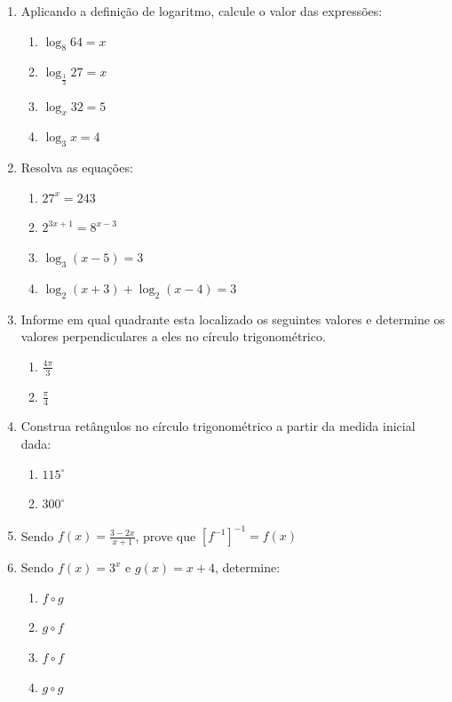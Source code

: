 \documentclass[oneside,a4paper,12pt]{article}
\begin{document}
\begin{enumerate}
	\item Aplicando a definição de logaritmo, calcule o valor das expressões:
	\begin{multicols}{4}
	\begin{enumerate}
		\item $ \log_{8}64=x$
		\item $ \log_{\frac{1}{3}}27=x$
		\item $ \log_{x}32=5$
		\item $ \log_{3}x=4$
	\end{enumerate}
	\end{multicols}

	\item Resolva as equações:
	\begin{multicols}{2}
	\begin{enumerate}
		\item $27^{x} = 243$
		\item $2^{3x+1} = 8^{x-3}$
		\item $\log_{3}(x-5) = 3$
		\item $\log_{2}(x+3) + \log_{2}(x-4) = 3$
	\end{enumerate}
	\end{multicols}

	\item Informe em qual quadrante esta localizado os seguintes valores e determine os valores perpendiculares a eles no círculo trigonométrico.
	\begin{multicols}{2}
	\begin{enumerate}
		\item $\frac{4 \pi }{3}$
		\item $\frac{\pi}{4}$
	\end{enumerate}
	\end{multicols}

	\item Construa retângulos no círculo trigonométrico a partir da medida inicial dada:
	\begin{multicols}{2}
	\begin{enumerate}
		\item $115^{\circ}$
		\item $300^{\circ}$
	\end{enumerate}
	\end{multicols}

	\item Sendo $f(x) = \frac{3 - 2x}{x+1}$, prove que $[f^{-1}]^{-1}=f(x)$
	
	\item Sendo $f(x) = 3^{x}$ e $g(x) = x+4$, determine:
	\begin{multicols}{4}
	\begin{enumerate}
		\item $f \circ g$
		\item $g \circ f$
		\item $f \circ f$
		\item $g \circ g$
	\end{enumerate}
	\end{multicols}


\end{enumerate}
\end{document}
